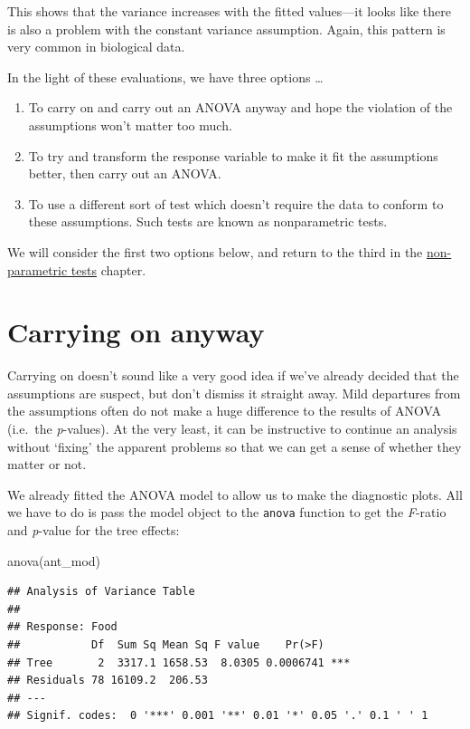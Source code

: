 \documentclass[
]{book}
\newenvironment{Shaded}{\begin{snugshade}}{\end{snugshade}}
\newcommand{\FunctionTok}[1]{\textcolor[rgb]{0.00,0.00,0.00}{#1}}
\newcommand{\NormalTok}[1]{#1}
\begin{document}
This shows that the variance increases with the fitted values---it looks like there is also a problem with the constant variance assumption. Again, this pattern is very common in biological data.

In the light of these evaluations, we have three options \ldots{}

\begin{enumerate}
\def\labelenumi{\arabic{enumi}.}
\item
  To carry on and carry out an ANOVA anyway and hope the violation of the assumptions won't matter too much.
\item
  To try and transform the response variable to make it fit the assumptions better, then carry out an ANOVA.
\item
  To use a different sort of test which doesn't require the data to conform to these assumptions. Such tests are known as nonparametric tests.
\end{enumerate}

We will consider the first two options below, and return to the third in the \protect\hyperlink{non-parametric-tests}{non-parametric tests} chapter.

\hypertarget{carry-on}{%
\section{Carrying on anyway}\label{carry-on}}

Carrying on doesn't sound like a very good idea if we've already decided that the assumptions are suspect, but don't dismiss it straight away. Mild departures from the assumptions often do not make a huge difference to the results of ANOVA (i.e.~the \emph{p}-values). At the very least, it can be instructive to continue an analysis without `fixing' the apparent problems so that we can get a sense of whether they matter or not.

We already fitted the ANOVA model to allow us to make the diagnostic plots. All we have to do is pass the model object to the \texttt{anova} function to get the \emph{F}-ratio and \emph{p}-value for the tree effects:

\begin{Shaded}
\begin{Highlighting}[]
\FunctionTok{anova}\NormalTok{(ant\_mod)}
\end{Highlighting}
\end{Shaded}

\begin{verbatim}
## Analysis of Variance Table
## 
## Response: Food
##           Df  Sum Sq Mean Sq F value    Pr(>F)    
## Tree       2  3317.1 1658.53  8.0305 0.0006741 ***
## Residuals 78 16109.2  206.53                      
## ---
## Signif. codes:  0 '***' 0.001 '**' 0.01 '*' 0.05 '.' 0.1 ' ' 1
\end{verbatim}
\end{document}
